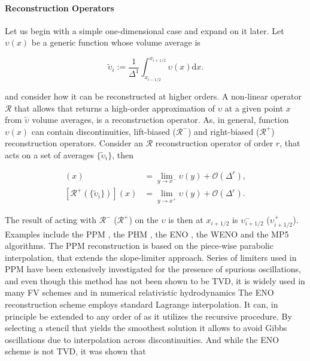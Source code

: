 \paragraph{Reconstruction Operators}

Let us begin with a simple one-dimensional case and expand on it later. 
Let $\upsilon(x)$ be a generic function whose volume average is 

\begin{equation}
\widetilde{\upsilon}_i := \frac{1}{\Delta^1}\int_{x_{i-1/2}}^{x_{i+1/2}}\upsilon(x)\text{d}x.
\end{equation}

and consider how it can be reconstructed at higher orders. A non-linear operator  $\mathcal{R}$ that allows that returns a high-order approximation of $\upsilon$ at a given point $x$ from $\widetilde{\upsilon}$ volume averages, is a reconstruction operator. As, in general, function $\upsilon(x)$ can contain discontinuities, lift-biased ($\mathcal{R}^-$) and right-biased ($\mathcal{R}^+$) reconstruction operators. Consider an $\mathcal{R}$ reconstruction operator of order $r$, that acts on a set of averages $\{\widetilde{\upsilon}_i\}$, then

\begin{align}
[\mathcal{R}^{-}(\{\widetilde{\upsilon}_{i}\})](x) &= \lim_{y\rightarrow x^{-}} \upsilon(y) + \mathcal{O}(\Delta^r), \\
[\mathcal{R}^{+}(\{\widetilde{\upsilon}_{i}\})](x) &= \lim_{y\rightarrow x^{+}} \upsilon(y) + \mathcal{O}(\Delta^r).
\end{align}

The result of acting with $\mathcal{R}^-$ ($\mathcal{R}^+$) on the $\upsilon$ is then at $x_{i+1/2}$ is $\upsilon^{-}_{i+1/2}$ ($\upsilon^{+}_{i+1/2}$). 
%
Examples include 
the \ac{PPM} \citep{Colella:1984,Colella:2008}, 
the \ac{PHM} \citep{Marquina:1994}, 
the \ac{ENO} \citep{Harten:1987,Shu:1988,Shu:1989}, 
the \ac{WENO} \citep{Liu:1994,Jiang:1996} and 
the \ac{MP5} \citep{Suresh:1997} 
algorithms.
%
The \ac{PPM} reconstruction is based on the piece-wise parabolic interpolation, that extends the slope-limiter approach. 
Series of limiters used in \ac{PPM} have been extensively investigated for the presence of spurious oscillations, and even though this method has not been shown to be \ac{TVD}, it is widely used in many \ac{FV} schemes and in numerical relativistic hydrodynamics \cite{Baiotti:2004wn,Mignone:2005ns}
%
The \ac{ENO} reconstruction scheme employs standard Lagrange interpolation. 
It can, in principle be extended to any order of as it utilizes the recursive procedure. By selecting a stencil that yields the smoothest solution it allows to avoid Gibbs oscillations due to interpolation across discontinuities. 
And while the \ac{ENO} scheme is not \ac{TVD}, it was shown that 

